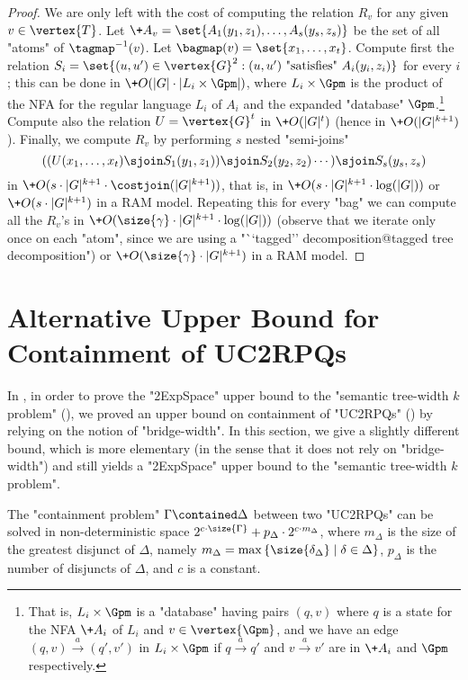 \begin{proof}
    We are only left with the cost of computing the relation $R_v$ for any given $v \in \vertex{T}$. Let $\+A_v= \set{A_1(y_1,z_1), \dotsc, A_s(y_s,z_s)}$ be the set of all "atoms" of $\tagmap^{-1}(v)$. Let $\bagmap(v)=\set{x_1, \dotsc, x_t}$.
    Compute first the relation $S_i = \set{ (u,u') \in \vertex{G}^2 : (u,u') \text{ "satisfies" } A_i(y_i,z_i)}$ for every $i$; this can be done in $\+O(|G| \cdot |L_i \times \Gpm|)$, where $L_i \times \Gpm$ is the product of the NFA for the regular language $L_i$ of $A_i$ and the expanded "database" $\Gpm$.\footnote{That is, $L_i \times \Gpm$ is a  "database" having pairs $(q,v)$ where $q$ is a state for the NFA $\+A_i$ of $L_i$ and $v \in \vertex{\Gpm}$, and we have an edge $(q,v) \xrightarrow{a} (q',v')$ in $L_i \times \Gpm$ if  $q \xrightarrow{a} q'$ and $v \xrightarrow{a} v'$ are in $\+A_i$ and $\Gpm$ respectively.} Compute also the relation $U = \vertex{G}^t$ in $\+O(|G|^{t})$ (hence in $\+O(|G|^{k+1})$). Finally, we compute $R_v$ by performing $s$ nested "semi-joins" 
    \[
        ((U(x_1, \dotsc, x_t) \sjoin S_1(y_1,z_1)) \sjoin S_2(y_2,z_2) \dotsb )\sjoin S_s(y_s,z_s) 
    \]
    in $\+O(s \cdot |G|^{k+1} \cdot \costjoin(|G|^{k+1}))$, that is, in $\+O(s \cdot |G|^{k+1} \cdot \log(|G|))$ or $\+O(s \cdot |G|^{k+1})$ in a RAM model. Repeating this for every "bag" we can compute all the $R_v$'s in $\+O(\size{\gamma} \cdot |G|^{k+1} \cdot \log(|G|))$ (observe that we iterate only once on each "atom", since we are using a "``tagged'' decomposition@tagged tree decomposition") or $\+O(\size{\gamma} \cdot |G|^{k+1})$ in a RAM model.
\end{proof}


\section{\AP{}Alternative Upper Bound for Containment of UC2RPQs}
\label{apdx-sec:alternative-upper-bound-containment}

In , in order to prove the "2ExpSpace" upper bound to the 
"semantic tree-width $k$ problem" (), we proved an upper bound on containment
of "UC2RPQs" () by relying on the notion of "bridge-width".
In this section, we give a slightly different bound, which is more elementary (in the sense that it 
does not rely on "bridge-width") and still yields a "2ExpSpace" upper bound to the "semantic 
tree-width $k$ problem".

\begin{proposition}
	\AP\label{prop:bound-containment-pb-alt}
	The "containment problem" $\Gamma \contained \Delta$ between two "UC2RPQs" can be solved in non-deterministic space $2^{c\cdot \size{\Gamma}} + p_{\Delta} \cdot 2^{c\cdot m_\Delta}$, where $m_\Delta$ is the size of the greatest disjunct of $\Delta$, namely $m_\Delta = \max{\{\size{\delta_\Delta} \mid \delta \in \Delta\}}$, $p_\Delta$
	is the number of disjuncts of $\Delta$, and $c$ is a constant.
\end{proposition}

